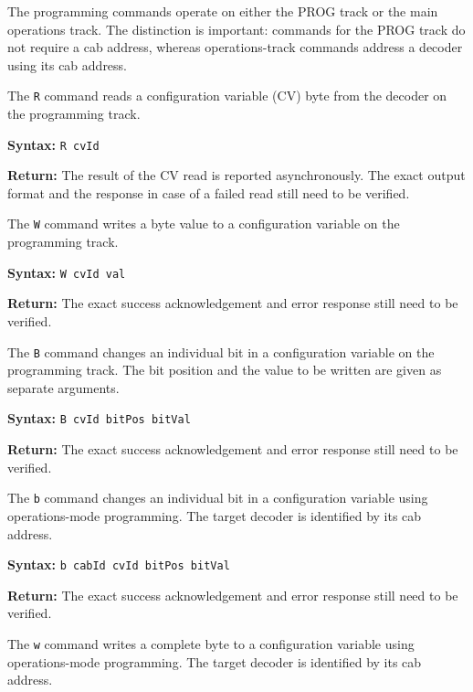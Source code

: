 The programming commands operate on either the PROG track or the main
operations track. The distinction is important: commands for the PROG track
do not require a cab address, whereas operations-track commands address a
decoder using its cab address.


The \texttt{R} command reads a configuration variable (CV) byte from the
decoder on the programming track.

\textbf{Syntax:} \texttt{R cvId}

\textbf{Return:} The result of the CV read is reported asynchronously.
The exact output format and the response in case of a failed read still
need to be verified.


The \texttt{W} command writes a byte value to a configuration variable on
the programming track.

\textbf{Syntax:} \texttt{W cvId val}

\textbf{Return:} The exact success acknowledgement and error response
still need to be verified.


The \texttt{B} command changes an individual bit in a configuration variable
on the programming track. The bit position and the value to be written are
given as separate arguments.

\textbf{Syntax:} \texttt{B cvId bitPos bitVal}

\textbf{Return:} The exact success acknowledgement and error response
still need to be verified.


The \texttt{b} command changes an individual bit in a configuration variable
using operations-mode programming. The target decoder is identified by its
cab address.

\textbf{Syntax:} \texttt{b cabId cvId bitPos bitVal}

\textbf{Return:} The exact success acknowledgement and error response
still need to be verified.


The \texttt{w} command writes a complete byte to a configuration variable
using operations-mode programming. The target decoder is identified by its
cab address.

